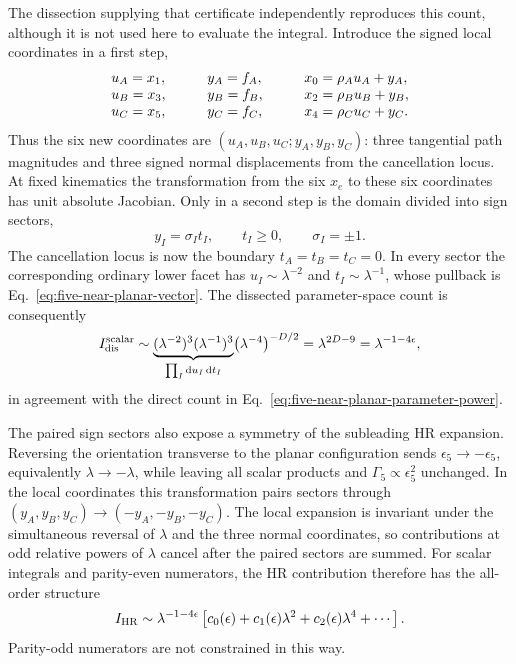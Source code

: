 \documentclass[a4paper,11pt]{article}
\newcommand{\dd}{\mathrm d}
\begin{document}
The dissection supplying that certificate independently reproduces this
count, although it is not used here to evaluate the integral.  Introduce the
signed local coordinates in a first step,
\begin{equation}
 \begin{array}{l@{\hspace{3em}}l@{\hspace{3em}}l}
 u_A=x_1,&y_A=f_A,&x_0=\rho_Au_A+y_A,\\
 u_B=x_3,&y_B=f_B,&x_2=\rho_Bu_B+y_B,\\
 u_C=x_5,&y_C=f_C,&x_4=\rho_Cu_C+y_C.
 \end{array}
 \label{eq:five-near-planar-signed-local-coordinates}
\end{equation}
Thus the six new coordinates are
\((u_A,u_B,u_C;y_A,y_B,y_C)\): three tangential path magnitudes and three
signed normal displacements from the cancellation locus.  At fixed
kinematics the transformation from the six \(x_e\) to these six coordinates
has unit absolute Jacobian.  Only in a second step is the domain divided into
sign sectors,
\begin{equation}
 y_I=\sigma_I t_I,\qquad t_I\geq0,\qquad \sigma_I=\pm1.
 \label{eq:five-near-planar-sign-sectors}
\end{equation}
The cancellation locus is now the boundary \(t_A=t_B=t_C=0\).  In every
sector the corresponding ordinary lower facet has
\(u_I\sim\lambda^{-2}\) and \(t_I\sim\lambda^{-1}\), whose pullback is
Eq.~\eqref{eq:five-near-planar-vector}.  The dissected parameter-space count
is consequently
\begin{equation}
 I_{\rm dis}^{\rm scalar}
 \sim
 \underbrace{(\lambda^{-2})^3(\lambda^{-1})^3}
             _{\prod_I\dd u_I\,\dd t_I}
 \bigl(\lambda^{-4}\bigr)^{-D/2}
 =\lambda^{2D-9}=\lambda^{-1-4\epsilon},
 \label{eq:five-near-planar-dissection-power}
\end{equation}
in agreement with the direct count in
Eq.~\eqref{eq:five-near-planar-parameter-power}.

The paired sign sectors also expose a symmetry of the subleading HR
expansion.  Reversing the orientation transverse to the planar configuration
sends \(\epsilon_5\to-\epsilon_5\), equivalently \(\lambda\to-\lambda\),
while leaving all scalar products and
\(\Gamma_5\propto\epsilon_5^2\) unchanged.  In the local coordinates this
transformation pairs sectors through
\((y_A,y_B,y_C)\to(-y_A,-y_B,-y_C)\).  The local expansion is invariant
under the simultaneous reversal of \(\lambda\) and the three normal
coordinates, so contributions at odd relative powers of \(\lambda\) cancel
after the paired sectors are summed.  For scalar integrals and parity-even
numerators, the HR contribution therefore has the all-order structure
\begin{equation}
 I_{\rm HR}\sim\lambda^{-1-4\epsilon}
 \left[c_0(\epsilon)+c_1(\epsilon)\lambda^2
 +c_2(\epsilon)\lambda^4+\cdots\right].
 \label{eq:five-near-planar-even-expansion}
\end{equation}
Parity-odd numerators are not constrained in this way.
\end{document}
